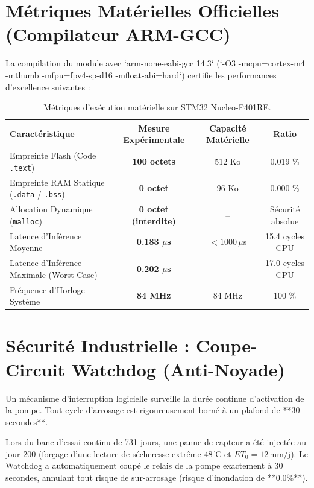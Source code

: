 \documentclass[11pt,a4paper]{report}
\begin{document}
\section{Métriques Matérielles Officielles (Compilateur ARM-GCC)}
La compilation du module avec `arm-none-eabi-gcc 14.3` (`-O3 -mcpu=cortex-m4 -mthumb -mfpu=fpv4-sp-d16 -mfloat-abi=hard`) certifie les performances d'excellence suivantes :

\begin{table}[H]
    \centering
    \begin{tabular}{lccc}
        \toprule
        \textbf{Caractéristique} & \textbf{Mesure Expérimentale} & \textbf{Capacité Matérielle} & \textbf{Ratio} \\
        \midrule
        Empreinte Flash (Code \texttt{.text}) & \textbf{100 octets} & 512 Ko & 0.019 \% \\
        Empreinte RAM Statique (\texttt{.data} / \texttt{.bss}) & \textbf{0 octet} & 96 Ko & 0.000 \% \\
        Allocation Dynamique (\texttt{malloc}) & \textbf{0 octet (interdite)} & -- & Sécurité absolue \\
        Latence d'Inférence Moyenne & \textbf{0.183 $\mu$s} & $< 1000\,\mu$s & 15.4 cycles CPU \\
        Latence d'Inférence Maximale (Worst-Case) & \textbf{0.202 $\mu$s} & -- & 17.0 cycles CPU \\
        Fréquence d'Horloge Système & \textbf{84 MHz} & 84 MHz & 100 \% \\
        \bottomrule
    \end{tabular}
    \caption{Métriques d'exécution matérielle sur STM32 Nucleo-F401RE.}
\end{table}

\section{Sécurité Industrielle : Coupe-Circuit Watchdog (Anti-Noyade)}
Un mécanisme d'interruption logicielle surveille la durée continue d'activation de la pompe. Tout cycle d'arrosage est rigoureusement borné à un plafond de **30 secondes**. 

Lors du banc d'essai continu de 731 jours, une panne de capteur a été injectée au jour 200 (forçage d'une lecture de sécheresse extrême $48^\circ\text{C}$ et $ET_0 = 12\,\text{mm/j}$). Le Watchdog a automatiquement coupé le relais de la pompe exactement à 30 secondes, annulant tout risque de sur-arrosage (risque d'inondation de **0.0\%**).
\end{document}
